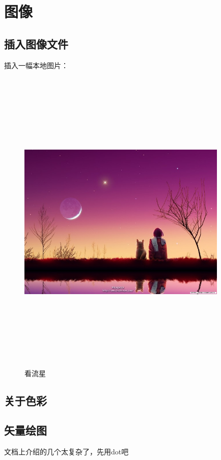 \documentclass[a4paper,12pt]{article} %
\begin{document}
\section{图像}

\subsection{插入图像文件}
插入一幅本地图片：\\
\begin{figure}[htbp] %
  \centering
  \includegraphics[width=10cm,height=15cm,keepaspectratio]{pic1.jpg}
  \caption{看流星}
  \label{fig:star1}
\end{figure}

\subsection{关于色彩} %

\subsection{矢量绘图}
文档上介绍的几个太复杂了，先用dot吧\\
\end{document}
